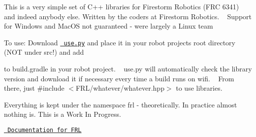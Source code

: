 This is a very simple set of C++ libraries for Firestorm Robotics (FRC 6341) and indeed anybody else. Written by the coders at Firestorm Robotics. ~\newline
 Support for Windows and Mac\+OS not guaranteed -\/ we\textquotesingle{}re largely a Linux team

To use\+: Download \href{https://firestorm-robotics-code.github.io/FirestormRoboticsLibrary/use.py}{\texttt{ use.\+py}} and place it in your robot project\textquotesingle{}s root directory (NOT under src!) and add 
\begin{DoxyCode}{0}
\DoxyCodeLine{\}}
\DoxyCodeLine{}

\end{DoxyCode}
 to {\ttfamily build.\+gradle} in your robot project. ~\newline
 {\ttfamily use.\+py} will automatically check the library version and download it if necessary every time a build runs on wifi. ~\newline
 From there, just {\ttfamily \#include \texorpdfstring{$<$}{<}FRL/whatever/whatever.\+hpp\texorpdfstring{$>$}{>}} to use libraries.

Everything is kept under the namespace {\ttfamily frl} -\/ theoretically. In practice almost nothing is. This is a Work In Progress.

\href{https://firestorm-robotics-code.github.io/FirestormRoboticsLibrary/html/}{\texttt{ Documentation for FRL}} 